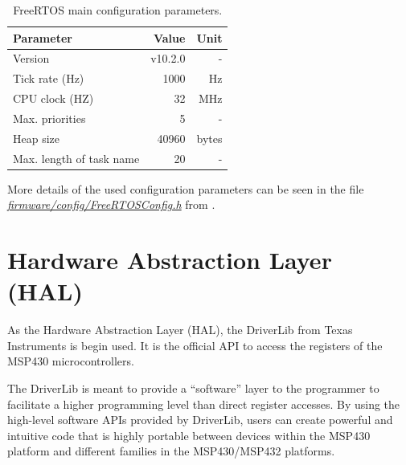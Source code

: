 \begin{table}[!ht]
	\centering
	\begin{tabular}{lrr}
		\toprule[1.5pt]
		\textbf{Parameter}       & \textbf{Value} & \textbf{Unit} \\
		\midrule
		Version                  & v10.2.0        & -             \\
		Tick rate (Hz)           & 1000           & Hz            \\
		CPU clock (HZ)           & 32             & MHz           \\
		Max. priorities          & 5              & -             \\
		Heap size                & 40960          & bytes         \\
		Max. length of task name & 20             & -             \\
		\bottomrule[1.5pt]
	\end{tabular}
	\caption{FreeRTOS main configuration parameters.}
	\label{tab:freertos-config}
\end{table}

More details of the used configuration parameters can be seen in the file \textit{\href{https://github.com/spacelab-ufsc/obdh2/blob/master/firmware/config/FreeRTOSConfig.h}{firmware/config/FreeRTOSConfig.h}} from \cite{obdh2-repo}.

\section{Hardware Abstraction Layer (HAL)}

As the Hardware Abstraction Layer (HAL), the DriverLib \cite{driverlib} from Texas Instruments is begin used. It is the official API to access the registers of the MSP430 microcontrollers.

The DriverLib is meant to provide a ``software'' layer to the programmer to facilitate a higher programming level than direct register accesses. By using the high-level software APIs provided by DriverLib, users can create powerful and intuitive code that is highly portable between devices within the MSP430 platform and different families in the MSP430/MSP432 platforms.



